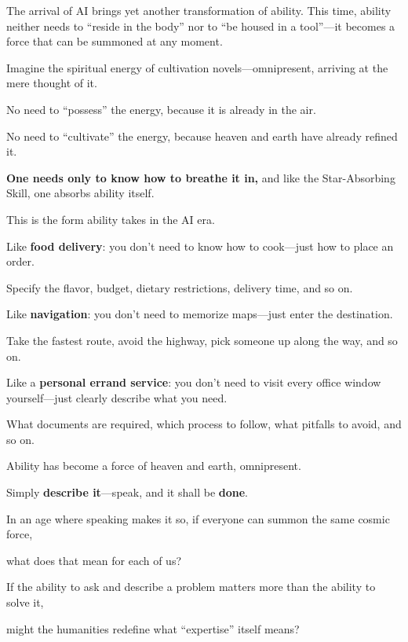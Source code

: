 The arrival of AI brings yet another transformation of ability. This time, ability neither needs to ``reside in the body'' nor to ``be housed in a tool''---it becomes a force that can be summoned at any moment.

Imagine the spiritual energy of cultivation novels---omnipresent, arriving at the mere thought of it.

No need to ``possess'' the energy, because it is already in the air.

No need to ``cultivate'' the energy, because heaven and earth have already refined it.

\textbf{One needs only to know how to breathe it in,} and like the Star-Absorbing Skill, one absorbs ability itself.

\vspace{1em}

This is the form ability takes in the AI era.

Like \textbf{food delivery}: you don't need to know how to cook---just how to place an order.

Specify the flavor, budget, dietary restrictions, delivery time, and so on.

\vspace{0.5em}

Like \textbf{navigation}: you don't need to memorize maps---just enter the destination.

Take the fastest route, avoid the highway, pick someone up along the way, and so on.

\vspace{0.5em}

Like a \textbf{personal errand service}: you don't need to visit every office window yourself---just clearly describe what you need.

What documents are required, which process to follow, what pitfalls to avoid, and so on.

\vspace{1em}

Ability has become a force of heaven and earth, omnipresent.

Simply \textbf{describe it}---speak, and it shall be \textbf{done}.

\begin{thinkbox}[Reflection]
In an age where speaking makes it so, if everyone can summon the same cosmic force,

what does that mean for each of us?

\vspace{1em}

If the ability to ask and describe a problem matters more than the ability to solve it,

might the humanities redefine what ``expertise'' itself means?
\end{thinkbox}

